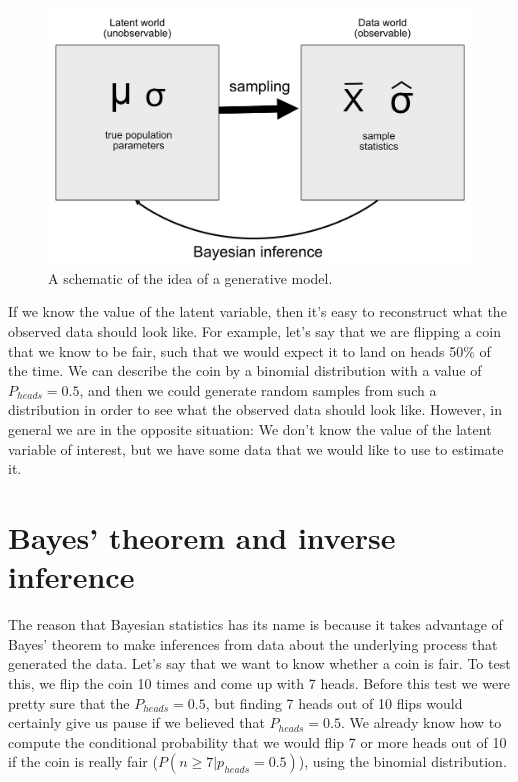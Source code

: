 \documentclass[12pt,]{book}
\theoremstyle{definition}
\theoremstyle{definition}
\theoremstyle{definition}
\theoremstyle{remark}
\begin{document}
\begin{figure}
\includegraphics[width=0.8\linewidth]{images/BayesianInference} \caption{A schematic of the idea of a generative model.}\label{fig:GenerativeModel}
\end{figure}

If we know the value of the latent variable, then it's easy to reconstruct what the observed data should look like. For example, let's say that we are flipping a coin that we know to be fair, such that we would expect it to land on heads 50\% of the time. We can describe the coin by a binomial distribution with a value of \(P_{heads}=0.5\), and then we could generate random samples from such a distribution in order to see what the observed data should look like. However, in general we are in the opposite situation: We don't know the value of the latent variable of interest, but we have some data that we would like to use to estimate it.

\hypertarget{bayes-theorem-and-inverse-inference}{%
\section{Bayes' theorem and inverse inference}\label{bayes-theorem-and-inverse-inference}}

The reason that Bayesian statistics has its name is because it takes advantage of Bayes' theorem to make inferences from data about the underlying process that generated the data. Let's say that we want to know whether a coin is fair. To test this, we flip the coin 10 times and come up with 7 heads. Before this test we were pretty sure that the \(P_{heads}=0.5\), but finding 7 heads out of 10 flips would certainly give us pause if we believed that \(P_{heads}=0.5\). We already know how to compute the conditional probability that we would flip 7 or more heads out of 10 if the coin is really fair (\(P(n\ge7|p_{heads}=0.5)\)), using the binomial distribution.
\end{document}
